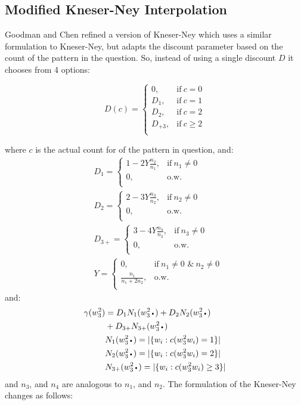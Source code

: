 \documentclass[11pt]{article}
\newcommand*{\LargerCdot}{\raisebox{-0.75ex}{\scalebox{2}{$\cdot$}}}
\begin{document}
\subsection{Modified Kneser-Ney Interpolation}
Goodman and Chen refined a version of Kneser-Ney which uses a similar formulation to Kneser-Ney, but adapts the discount parameter based on the count of the pattern in the question. So, instead of using a single discount $D$ it chooses from 4 options:

\begin{equation}\label{disc}
    D(c)=
    \begin{cases}
      0, & \text{if}\ c=0 \\
      D_1, & \text{if}\ c=1 \\
      D_2, & \text{if}\ c=2 \\
      D_{+3}, & \text{if}\ c\geq2 \\
    \end{cases}
\end{equation}

where $c$ is the actual count for of the pattern in question, and:
\begin{align}\label{mkndiscounts1}
&D_1 = 
     \begin{cases}
	1 - 2 Y \frac{n_2}{n_1}, & \text{if}\ n_1\neq 0 \\
	0, & \text{o.w. } \\
     \end{cases}\\
&D_2 = \label{mkndiscounts2}
     \begin{cases}
	2 - 3 Y \frac{n_3}{n_2}, & \text{if}\ n_2\neq 0 \\
	0, & \text{o.w. }\\
     \end{cases}\\
&D_{3+} = \label{mkndiscounts3+}
\begin{cases}
	3 - 4 Y \frac{n_4}{n_3}, & \text{if}\ n_3\neq 0 \\
	0, & \text{o.w. } \\
     \end{cases}\\
&Y = \label{mkndiscounts}
	\begin{cases}
	0, & \text{if}\ n_1\neq 0 \text{ \&}\ n_2\neq 0  \\
	\frac{n_1}{n_1+2n_2}, & \text{o.w. }\\
	\end{cases}
\end{align}
and:
\begin{align}\label{gamma}
\gamma(w^{2}_{3}) &= D_1N_1(w^{2}_{3}\LargerCdot) + D_2N_2(w^{2}_{3}\LargerCdot) \\\nonumber
&+ D_{3+}N_{3+}(w^{2}_{3}\LargerCdot)\\
&N_{1}(w^{2}_{3}\LargerCdot) = |\{w_i: c(w^{2}_{3}w_i)=1\}|\\
&N_{2}(w^{2}_{3}\LargerCdot) = |\{w_i: c(w^{2}_{3}w_i)=2\}|\\
&N_{3+}(w^{2}_{3}\LargerCdot) = |\{w_i: c(w^{2}_{3}w_i)\geq3\}|
\end{align}
and $n_3$, and $n_4$ are analogous to $n_1$, and $n_2$. The formulation of the Kneser-Ney changes as follows: 
\end{document}
